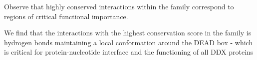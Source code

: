 Observe that highly conserved interactions within the family correspond to regions of critical functional importance.

We find that the interactions with the highest conservation score in the family is hydrogen bonds maintaining a local conformation around the DEAD box - which is critical for protein-nucleotide interface and the functioning of all DDX proteins